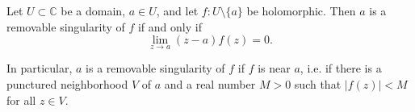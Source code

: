 \documentclass[12pt]{article}
\begin{document}
Let $U\subset\mathbb{C}$ be a domain, $a\in U$, and let $f:U\setminus\{a\}$ be holomorphic.  Then $a$ is a removable singularity of $f$ if and only if
$$
\lim_{z\to a}(z-a)f(z)=0.
$$

In particular, $a$ is a removable singularity of $f$ if $f$ is  near $a$, i.e. if there is a punctured neighborhood $V$ of $a$ and a real number $M>0$ such that $|f(z)|<M$ for all $z\in V$.
\end{document}
